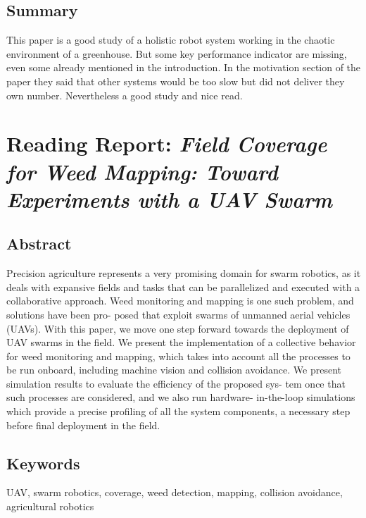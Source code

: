     \subsection*{Summary}
    This paper is a good study of a holistic robot system working in the chaotic environment of a greenhouse. But some key performance indicator are missing, even some already mentioned in the introduction. 
    In the motivation section of the paper they said that other systems would be too slow but did not deliver they own number. Nevertheless a good study and nice read.

    \newpage
    
    \section{Reading Report: \emph{Field Coverage for Weed Mapping: Toward Experiments with a UAV Swarm}}
    \label{sec:Albani2019}
    \cite{Albani2019}
    
    \subsection*{Abstract}
    Precision agriculture represents a very promising domain for
    swarm robotics, as it deals with expansive fields and tasks that can be
    parallelized and executed with a collaborative approach. Weed monitoring and mapping is one such problem, and solutions have been pro-
    posed that exploit swarms of unmanned aerial vehicles (UAVs). With this
    paper, we move one step forward towards the deployment of UAV swarms
    in the field. We present the implementation of a collective behavior for
    weed monitoring and mapping, which takes into account all the processes
    to be run onboard, including machine vision and collision avoidance. We
    present simulation results to evaluate the efficiency of the proposed sys-
    tem once that such processes are considered, and we also run hardware-
    in-the-loop simulations which provide a precise profiling of all the system
    components, a necessary step before final deployment in the field.
    
    \subsection*{Keywords}
    UAV, swarm robotics, coverage, weed detection, mapping, collision avoidance, agricultural robotics
    
     
